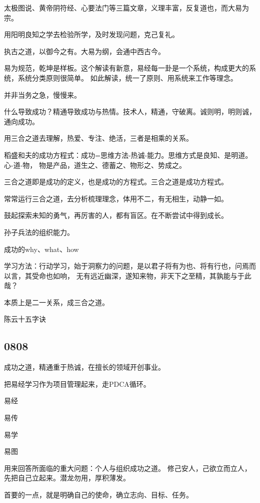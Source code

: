 太极图说、黄帝阴符经、心要法门等三篇文章，义理丰富，反复道也，而大易为宗。

用阳明良知之学去检验所学，及时发现问题，克己复礼。

执古之道，以御今之有。大易为纲，会通中西古今。

易为规范，乾坤是样板。这个解读有新意，易经每一卦是一个系统，构成更大的系统，系统分类原则很简单。
如此解读，统一了原则、用系统来工作等理念。

并非当务之急，慢慢来。

什么导致成功？精通导致成功与热情。技术人，精通，守破离。诚则明，明则诚，通向成功。

用三合之道去理解，热爱、专注、绝活，三者是相乘的关系。

稻盛和夫的成功方程式：成功=思维方法-热诚-能力。思维方式是良知、是明道。心-道-物，
物是产品，道生之、德蓄之、物形之、势成之。

三合之道即是成功的定义，也是成功的方程式。三合之道是成功方程式。

常常运行三合之道，去分析梳理理念，体用不二，有无相生，动静一如。

鼓起探索未知的勇气，再厉害的人，都有盲区。在不断尝试中得到成长。

孙子兵法的组织能力。

成功的why、what、how

学习方法：行动学习，始于洞察力的问题，是以君子将有为也、将有行也，问焉而以言，其受命也如响，
无有远近幽深，遂知来物，非天下之至精，其孰能与于此哉？

本质上是二一关系，成三合之道。

陈云十五字诀

\subsection{0808}

成功之道，精通重于热诚，在擅长的领域开创事业。

把易经学习作为项目管理起来，走PDCA循环。

\begin{enumbox}
\item 易经
\item 易传
\item 易学
\item 易图
\end{enumbox}

用来回答所面临的重大问题：个人与组织成功之道。
修己安人，己欲立而立人，先把自己立起来。潜龙勿用，厚积薄发。

首要的一点，就是明确自己的使命，确立志向、目标、任务。

